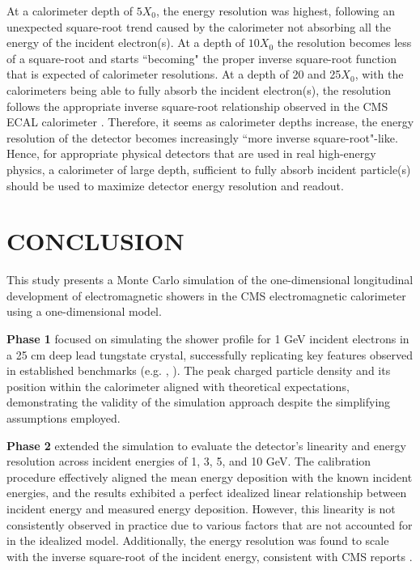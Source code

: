 \documentclass[twocolumn]{aastex631}
\begin{document}
At a calorimeter depth of $5X_0$, the energy resolution was highest, following
an unexpected square-root trend caused by the calorimeter not absorbing all the
energy of the incident electron(s). At a depth of $10X_0$ the resolution becomes less of a
square-root and starts ``becoming" the proper inverse square-root function that
is expected of calorimeter resolutions. At a depth of 20 and 25$X_0$, with the
calorimeters being able to fully absorb the incident electron(s), the resolution
follows the appropriate inverse square-root relationship observed in the CMS
ECAL calorimeter \citep{CMS2024arXiv2403.15518}. Therefore, it seems as
calorimeter depths increase, the energy resolution of the detector becomes
increasingly ``more inverse square-root"-like. Hence, for appropriate physical
detectors that are used in real high-energy physics, a calorimeter of large
depth, sufficient to fully absorb incident particle(s) should be used to maximize
detector energy resolution and readout. 


\section{CONCLUSION} \label{sec_4}
 

This study presents a Monte Carlo simulation of the one-dimensional longitudinal development of
electromagnetic showers in the CMS electromagnetic calorimeter using a one-dimensional model.

\textbf{Phase 1} focused on simulating the shower profile for 1 GeV incident
electrons in a 25 cm deep lead tungstate crystal, successfully replicating key
features observed in established benchmarks (e.g. \cite{CMS2024arXiv2403.15518},
\cite{Groom2019ParticlePassage}). The peak charged particle
density and its position within the calorimeter aligned with theoretical
expectations, demonstrating the validity of the simulation approach despite the
simplifying assumptions employed.

\textbf{Phase 2} extended the simulation to evaluate the detector’s linearity
and energy resolution across incident energies of 1, 3, 5, and 10 GeV. The
calibration procedure effectively aligned the mean energy deposition with the
known incident energies, and the results exhibited a perfect idealized linear relationship
between incident energy and measured energy deposition. However, this linearity
is not consistently observed in practice due to various factors that are not
accounted for in the idealized model. Additionally, the energy
resolution was found to scale with the inverse square-root of the incident energy,
consistent with CMS reports \citep{CMS2024arXiv2403.15518}. 
\end{document}
